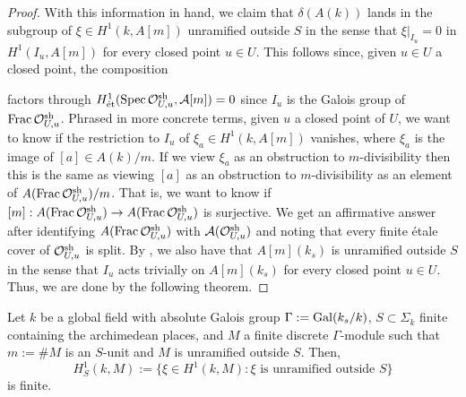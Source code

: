 \documentclass[11pt]{article}
\begin{document}
\begin{proof}
With this information in hand, we claim that $\delta(A(k))$ lands in the subgroup of $\xi\in H^1(k,A[m])$ unramified outside $S$ in the sense that $\xi|_{I_u}=0$ in $H^1(I_u,A[m])$ for every closed point $u\in U$. This follows since, given $u\in U$ a closed point, the composition
\begin{center}
\end{center}
factors through $H_{\operatorname{\acute{e}t}}^1(\operatorname{Spec}\mathcal{O}_{U,u}^{\operatorname{sh}},\mathcal{A}[m])=0$ since $I_u$ is the Galois group of $\operatorname{Frac}\mathcal{O}_{U,u}^{\operatorname{sh}}$. Phrased in more concrete terms, given $u$ a closed point of $U$, we want to know if the restriction to $I_u$ of $\xi_a\in H^1(k,A[m])$ vanishes, where $\xi_a$ is the image of $[a]\in A(k)/m$. If we view $\xi_a$ as an obstruction to $m$-divisibility then this is the same as viewing $[a]$ as an obstruction to $m$-divisibility as an element of $A(\operatorname{Frac}\mathcal{O}_{U,u}^{\operatorname{sh}})/m$. That is, we want to know if $[m]: A(\operatorname{Frac}\mathcal{O}_{U,u}^{\operatorname{sh}})\to A(\operatorname{Frac}\mathcal{O}_{U,u}^{\operatorname{sh}})$ is surjective. We get an affirmative answer after identifying $A(\operatorname{Frac}\mathcal{O}_{U,u}^{\operatorname{sh}})$ with $\mathcal{A}(\mathcal{O}_{U,u}^{\operatorname{sh}})$ and noting that every finite \'{e}tale cover of $\mathcal{O}_{U,u}^{\operatorname{sh}}$ is split. By \cite[\textrm{Cor 9.3.4}]{Conrad}, we also have that $A[m](k_s)$ is unramified outside $S$ in the sense that $I_u$ acts trivially on $A[m](k_s)$ for every closed point $u\in U$. Thus, we are done by the following theorem.
\end{proof}

\begin{theorem}\label{WMW_Redux_Thm}
Let $k$ be a global field with absolute Galois group $\Gamma:=\operatorname{Gal}(k_s/k)$, $S\subset\Sigma_k$ finite containing the archimedean places, and $M$ a finite discrete $\Gamma$-module such that $m:=\#M$ is an $S$-unit and $M$ is unramified outside $S$. Then, 
$$H_S^1(k,M):=\{\xi\in H^1(k,M) : \xi\textrm{ is unramified outside }S\}$$
is finite.
\end{theorem}
\end{document}
